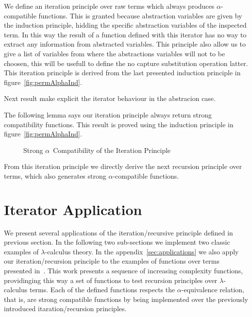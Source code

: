 \documentclass{entcs}
\newcommand{\alp}{\ensuremath{\alpha}}
\newcommand{\lamb}{\ensuremath{\lambda}}
\begin{document}
 \hspace{5px}

We define an iteration principle over raw terms which always produces \alp-compatible functions. This is granted because abstraction variables are given by the induction principle, hidding the specific abstraction variables of the inspected term. In this way the result of a function defined with this iterator has no way to extract any information from abstracted variables. This principle also allow us to give a list of variables from where the abstractions variables will not to be choosen, this will be usefull to define the no capture substitution operation latter. This iteration principle is derived from the last presented induction principle in figure~\ref{fig:permAlphaInd}. 

 \hspace{5px}

Next result make explicit the iterator behaviour in the abstracion case.

 \hspace{5px}

The following lemma says our iteration principle always return strong compatibility functions. This result is proved using the induction principle in figure~\ref{fig:permAlphaInd}. 

\begin{figure}[!ht]
  \caption{Strong \alp\ Compatibility of the Iteration Principle}
\label{fig:strongAlphaComp}
\end{figure}

From this iteration principle we directly derive the next recursion principle over terms, which also generates strong \alp-compatible functions.


\section{Iterator Application}
\label{sec:itapp}

We present several applications of the iteration/recursive principle defined in previous section. In the following two sub-sections we implement two classic examples of \lamb-calculus theory. In the appendix~\ref{sec:applications} we also apply our iteration/recursion principle to the examples of functions over terms presented in~\cite{Norrish04recursivefunction}. This work presents a sequence of increasing complexity functions,  providinging this way a set of functions to test recursion principles over \lamb-calculus terms. Each of the defined functions respects the \alp-equivalence relation, that is, are strong compatible functions by being implemented over the previously introduced itaration/recursion principles. 
\end{document}

